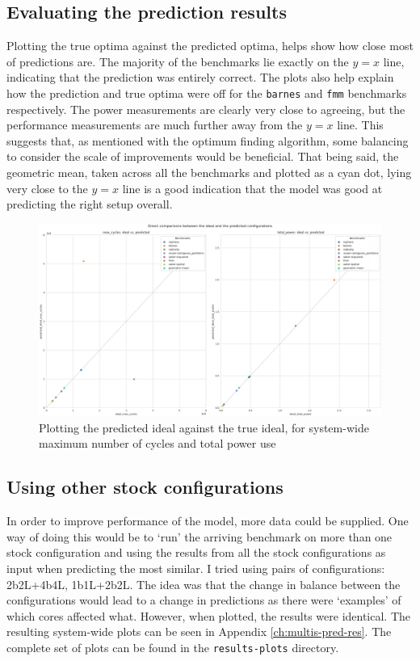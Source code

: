     \subsection{Evaluating the prediction results}
    Plotting the true optima against the predicted optima, helps show how close 
    most of predictions are. The majority of the benchmarks lie exactly on the 
    $y=x$ line, indicating that the prediction was entirely correct. The plots 
    also help explain how the prediction and true optima were off for the 
    \texttt{barnes} and \texttt{fmm} benchmarks respectively. The power 
    measurements are clearly very close to agreeing, but the performance 
    measurements are much further away from the $y=x$ line. This suggests that, 
    as mentioned with the optimum finding algorithm, some balancing to consider 
    the scale of improvements would be beneficial. That being said, the 
    geometric mean, taken across all the benchmarks and plotted as a cyan dot, 
    lying very close to the $y=x$ line is a good indication that the model was 
    good at predicting the right setup overall.
    \begin{figure}[H]
        \centering
        \includegraphics[width=\textwidth]{result-plots/stock-2b2L/system-scatter.png}
        \caption{Plotting the predicted ideal against the true ideal, for
                 system-wide maximum number of cycles and total power use}
    \end{figure}
    
    \subsection{Using other stock configurations}
    In order to improve performance of the model, more data could be supplied. 
    One way of doing this would be to `run' the arriving benchmark on more than 
    one stock configuration and using the results from all the stock 
    configurations as input when predicting the most similar. I tried using 
    pairs of configurations: 2b2L+4b4L, 1b1L+2b2L. The idea was that the change 
    in balance between the configurations would lead to a change in predictions 
    as there were `examples' of which cores affected what. However, when 
    plotted, the results were identical. The resulting system-wide plots can be 
    seen in Appendix \ref{ch:multis-pred-res}. The complete set of plots can be 
    found in the \texttt{results-plots} directory.
